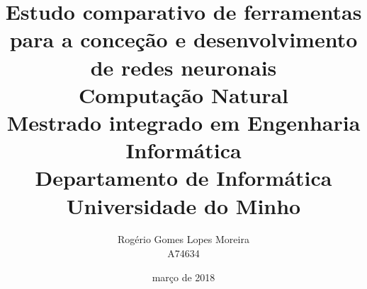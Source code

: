 \title{
	{Estudo comparativo de ferramentas para a conceção e desenvolvimento de redes neuronais}
	\vspace{7mm}
	\\{Computação Natural}\\
	{\large Mestrado integrado em Engenharia Informática}\\
	{\large Departamento de Informática}\\
	{\large Universidade do Minho}\\
}

\institute{}

\author{Rogério Gomes Lopes Moreira \\A74634}

\date{março de 2018}
\maketitle
